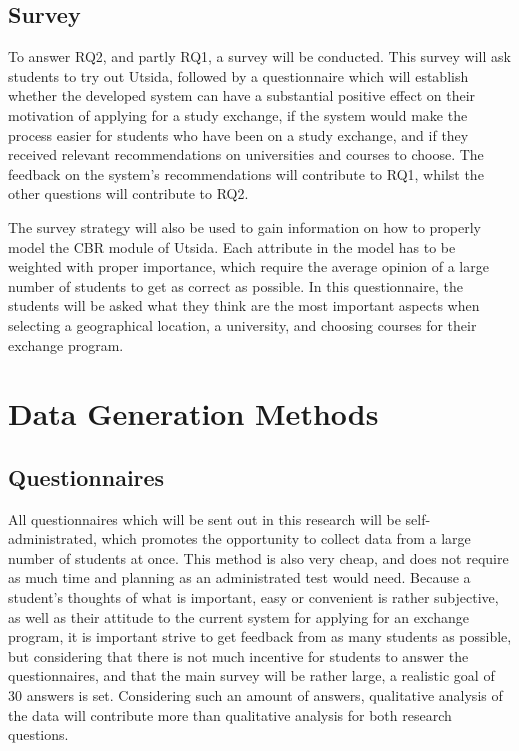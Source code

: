 \subsection{Survey}
To answer RQ2, and partly RQ1, a survey will be conducted. This survey will ask students to try out Utsida, followed by a questionnaire which will establish whether the developed system can have a substantial positive effect on their motivation of applying for a study exchange, if the system would make the process easier for students who have been on a study exchange, and if they received relevant recommendations on universities and courses to choose. The feedback on the system's recommendations will contribute to RQ1, whilst the other questions will contribute to RQ2. 

The survey strategy will also be used to gain information on how to properly model the CBR module of Utsida. Each attribute in the model has to be weighted with proper importance, which require the average opinion of a large number of students to get as correct as possible. In this questionnaire, the students will be asked what they think are the most important aspects when selecting a geographical location, a university, and choosing courses for their exchange program.


\section{Data Generation Methods}

\subsection{Questionnaires}

All questionnaires which will be sent out in this research will be self-administrated, which promotes the opportunity to collect data from a large number of students at once. This method is also very cheap, and does not require as much time and planning as an administrated test would need. Because a student's thoughts of what is important, easy or convenient is rather subjective, as well as their attitude to the current system for applying for an exchange program, it is important strive to get feedback from as many students as possible, but considering that there is not much incentive for students to answer the questionnaires, and that the main survey will be rather large, a realistic goal of 30 answers is set. Considering such an amount of answers, qualitative analysis of the data will contribute more than qualitative analysis for both research questions. 

